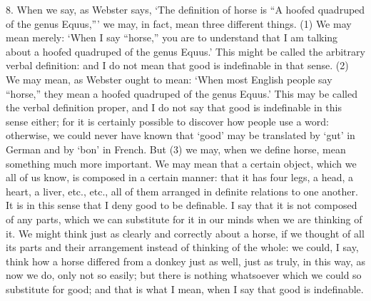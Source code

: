 8. When we say, as Webster says, `The definition of horse is ``A
hoofed quadruped of the genus Equus,''' we may, in fact, mean three
different things. (1) We may mean merely: `When I say ``horse,'' you
are to understand that I am talking about a hoofed quadruped of the
genus Equus.' This might be called the arbitrary verbal definition:
and I do not mean that good is indefinable in that sense. (2) We may
mean, as Webster ought to mean: `When most English people say
``horse,'' they mean a hoofed quadruped of the genus Equus.' This may
be called the verbal definition proper, and I do not say that good is
indefinable in this sense either; for it is certainly possible to
discover how people use a word: otherwise, we could never have known
that `good' may be translated by `gut' in German and by `bon' in
French. But (3) we may, when we define horse, mean something much more
important. We may mean that a certain object, which we all of us know,
is composed in a certain manner: that it has four legs, a head, a
heart, a liver, etc., etc., all of them arranged in definite relations
to one another. It is in this sense that I deny good to be definable.
I say that it is not composed of any parts, which we can substitute
for it in our minds when we are thinking of it. We might think just as
clearly and correctly about a horse, if we thought of all its parts
and their arrangement instead of thinking of the whole: we could, I
say, think how a horse differed from a donkey just as well, just as
truly, in this way, as now we do, only not so easily; but there is
nothing whatsoever which we could so substitute for good; and that is
what I mean, when I say that good is indefinable.

